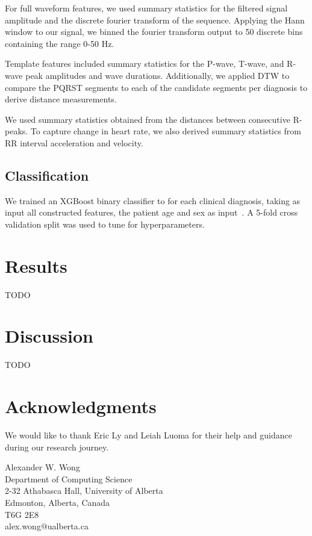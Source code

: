 \documentclass[twocolumn]{cinc}
\begin{document}
For full waveform features, we used summary statistics for the filtered signal amplitude and the discrete fourier transform of the sequence.
Applying the Hann window to our signal, we binned the fourier transform output to 50 discrete bins containing the range 0-50 Hz.

Template features included summary statistics for the P-wave, T-wave, and R-wave peak amplitudes and wave durations.
Additionally, we applied DTW to compare the PQRST segments to each of the candidate segments per diagnosis to derive distance measurements.

We used summary statistics obtained from the distances between consecutive R-peaks.
To capture change in heart rate, we also derived summary statistics from RR interval acceleration and velocity.

\subsection{Classification}

We trained an XGBoost binary classifier to for each clinical diagnosis, taking as input all constructed features, the patient age and sex as input~\cite{chen_xgboost_2016}.
A 5-fold cross validation split was used to tune for hyperparameters.

\section{Results}
TODO

\section{Discussion}
TODO

\section*{Acknowledgments}
We would like to thank Eric Ly and Leiah Luoma for their help and guidance during our research journey.



\begin{correspondence}
Alexander W. Wong\\
Department of Computing Science\\
2-32 Athabasca Hall, University of Alberta\\
Edmonton, Alberta, Canada\\
T6G 2E8\\
alex.wong@ualberta.ca
\end{correspondence}
\end{document}
